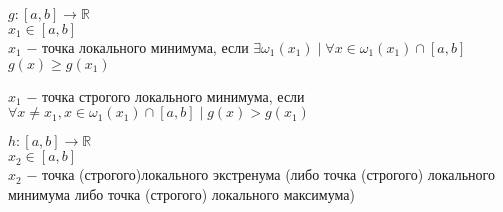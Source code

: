     \begin{definition}
        $g: [a,b] \to \mathbb{R}$ \\
        $x_1 \in [a,b]$ \\
        $x_1$ $-$ точка локального минимума, если $\exists \omega_1(x_1)\mid \forall x \in \omega_1(x_1)\cap [a,b]$ \\
        $g(x)\ge g(x_1)$
    \end{definition}
    \begin{definition}
        $x_1$ $-$ точка строгого локального минимума, если \\
        $\forall x\neq x_1, x \in \omega_1(x_1)\cap [a,b]\mid g(x)>g(x_1)$
    \end{definition}
    \begin{definition}
        $h: [a,b] \to \mathbb{R}$ \\
        $x_2 \in [a,b]$ \\
        $x_2$ $-$ точка (строгого)локального экстренума (либо точка (строгого) локального минимума либо точка (строгого) локального максимума)
    \end{definition}
    
    
